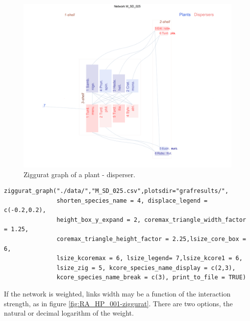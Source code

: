 \documentclass[11pt]{article}
\begin{document}
\begin{figure}[hp!]
\centering
\includegraphics[scale=0.4]{M_SD_025_ziggurat.png}
\caption {Ziggurat graph of a plant - disperser.}
\label{fig:KMAN_ziggurat_025}
\end{figure}

\fontsize{3.5mm}{3.5mm}\selectfont
\begin{verbatim}
ziggurat_graph("./data/","M_SD_025.csv",plotsdir="grafresults/",
               shorten_species_name = 4, displace_legend = c(-0.2,0.2),
               height_box_y_expand = 2, coremax_triangle_width_factor = 1.25,
               coremax_triangle_height_factor = 2.25,lsize_core_box = 6,
               lsize_kcoremax = 6, lsize_legend= 7,lsize_kcore1 = 6, 
               lsize_zig = 5, kcore_species_name_display = c(2,3), 
               kcore_species_name_break = c(3), print_to_file = TRUE)

\end{verbatim}
\normalsize

\clearpage

If the network is weighted, links width may be a function of the interaction strength, as in figure \ref{fig:RA_HP_001-ziggurat}. There are two options, the natural or decimal logarithm of the weight.
\end{document}

